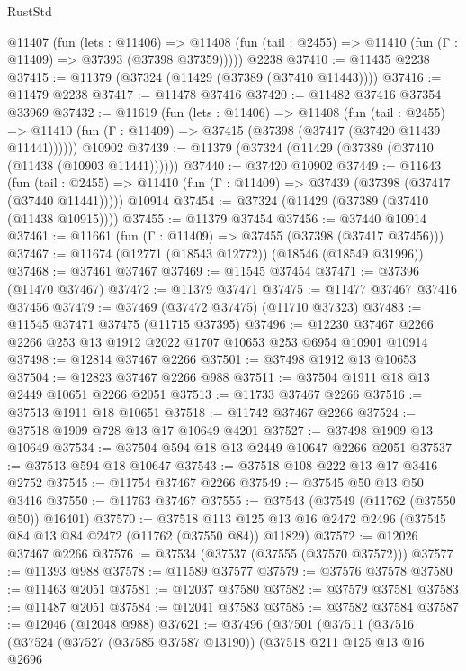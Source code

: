 \begin{lexlean}{RustStd}
\begin{coremodule}
    @11407
      (fun (lets : @11406) =>
      @11408 (fun (tail : @2455) => @11410 (fun (Γ : @11409) => @37393 (@37398 @37359)))))
    @2238
@37410 := @11435 @2238
@37415 := @11379 (@37324 (@11429 (@37389 (@37410 @11443))))
@37416 := @11479 @2238
@37417 := @11478 @37416
@37420 := @11482 @37416 @37354 @33969
@37432 := @11619
    (fun (lets : @11406) =>
    @11408
      (fun (tail : @2455) =>
      @11410 (fun (Γ : @11409) => @37415 (@37398 (@37417 (@37420 @11439 @11441))))))
    @10902
@37439 := @11379 (@37324 (@11429 (@37389 (@37410 (@11438 (@10903 @11441))))))
@37440 := @37420 @10902
@37449 := @11643
    (fun (tail : @2455) => @11410 (fun (Γ : @11409) => @37439 (@37398 (@37417 (@37440 @11441)))))
    @10914
@37454 := @37324 (@11429 (@37389 (@37410 (@11438 @10915))))
@37455 := @11379 @37454
@37456 := @37440 @10914
@37461 := @11661 (fun (Γ : @11409) => @37455 (@37398 (@37417 @37456)))
@37467 := @11674 (@12771 (@18543 @12772)) (@18546 (@18549 @31996))
@37468 := @37461 @37467
@37469 := @11545 @37454
@37471 := @37396 (@11470 @37467)
@37472 := @11379 @37471
@37475 := @11477 @37467 @37416 @37456
@37479 := @37469 (@37472 @37475) (@11710 @37323)
@37483 := @11545 @37471 @37475 (@11715 @37395)
@37496 := @12230 @37467 @2266 @2266 @253 @13 @1912 @2022 @1707 @10653 @253 @6954 @10901 @10914
@37498 := @12814 @37467 @2266
@37501 := @37498 @1912 @13 @10653
@37504 := @12823 @37467 @2266 @988
@37511 := @37504 @1911 @18 @13 @2449 @10651 @2266 @2051
@37513 := @11733 @37467 @2266
@37516 := @37513 @1911 @18 @10651
@37518 := @11742 @37467 @2266
@37524 := @37518 @1909 @728 @13 @17 @10649 @4201
@37527 := @37498 @1909 @13 @10649
@37534 := @37504 @594 @18 @13 @2449 @10647 @2266 @2051
@37537 := @37513 @594 @18 @10647
@37543 := @37518 @108 @222 @13 @17 @3416 @2752
@37545 := @11754 @37467 @2266
@37549 := @37545 @50 @13 @50 @3416
@37550 := @11763 @37467
@37555 := @37543 (@37549 (@11762 (@37550 @50)) @16401)
@37570 := @37518
    @113
    @125
    @13
    @16
    @2472
    @2496
    (@37545 @84 @13 @84 @2472 (@11762 (@37550 @84)) @11829)
@37572 := @12026 @37467 @2266
@37576 := @37534 (@37537 (@37555 (@37570 @37572)))
@37577 := @11393 @988
@37578 := @11589 @37577
@37579 := @37576 @37578
@37580 := @11463 @2051
@37581 := @12037 @37580
@37582 := @37579 @37581
@37583 := @11487 @2051
@37584 := @12041 @37583
@37585 := @37582 @37584
@37587 := @12046 (@12048 @988)
@37621 := @37496
    (@37501
      (@37511
        (@37516
          (@37524
            (@37527 (@37585 @37587 @13190))
            (@37518
              @211
              @125
              @13
              @16
              @2696

\end{coremodule}
\end{lexlean}

